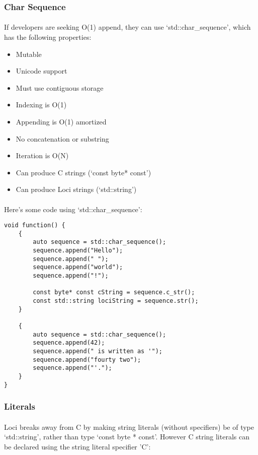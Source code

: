 \documentclass[12pt,twoside,notitlepage]{report}
\begin{document}
\subsubsection{Char Sequence}

\paragraph{}
If developers are seeking O(1) append, they can use `std::char_sequence', which has the following properties:

\begin{itemize}
\item Mutable
\item Unicode support
\item Must use contiguous storage
\item Indexing is O(1)
\item Appending is O(1) amortized
\item No concatenation or substring
\item Iteration is O(N)
\item Can produce C strings (`const byte* const')
\item Can produce Loci strings (`std::string')
\end{itemize}

\paragraph{}
Here's some code using `std::char_sequence':

\begin{lstlisting}
void function() {
	{
		auto sequence = std::char_sequence();
		sequence.append("Hello");
		sequence.append(" ");
		sequence.append("world");
		sequence.append("!");
		
		const byte* const cString = sequence.c_str();
		const std::string lociString = sequence.str();
	}
	
	{
		auto sequence = std::char_sequence();
		sequence.append(42);
		sequence.append(" is written as '");
		sequence.append("fourty two");
		sequence.append("'.");
	}
}
\end{lstlisting}

\subsubsection{Literals}

\paragraph{}
Loci breaks away from C by making string literals (without specifiers) be of type `std::string', rather than type `const byte * const'. However C string literals can be declared using the string literal specifier 'C':
\end{document}
